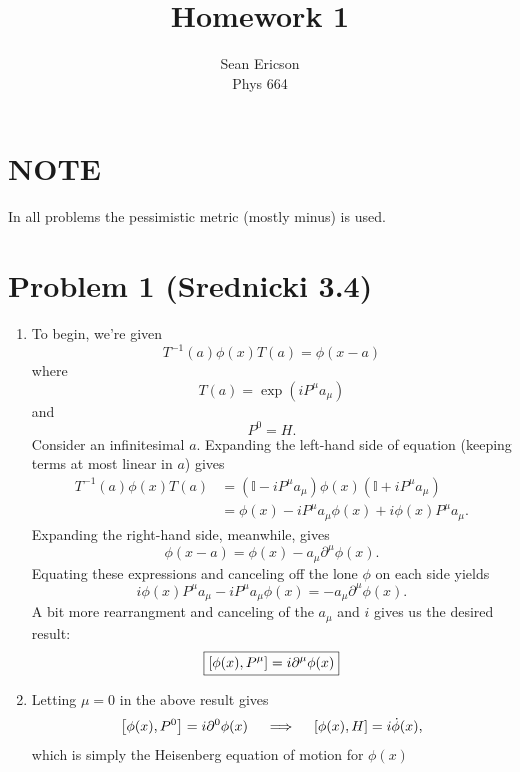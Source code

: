 \documentclass[12pt]{article}
\begin{document}
\title{Homework 1}
\author{Sean Ericson \\ Phys 664}
\maketitle

\section*{NOTE}
In all problems the pessimistic metric (mostly minus) is used.

\section*{Problem 1 \small{(Srednicki 3.4)}}
\begin{enumerate}[label=(\alph*)]
    \item To begin, we're given
    \begin{equation} \label{1} T^{-1}(a)\phi(x)T(a) = \phi(x-a) \end{equation}
    where
    \[ T(a) = \exp(iP^\mu a_\mu) \]
    and
    \[ P^0 = H. \]
    Consider an infinitesimal $a$. Expanding the left-hand side of equation  (keeping terms at most linear in $a$) gives
    \begin{align*}
        T^{-1}(a)\phi(x)T(a) &= \left(\mathbb{I} - iP^\mu a_\mu\right)\phi(x)\left(\mathbb{I} + iP^\mu a_\mu\right) \\
        &= \phi(x) - iP^\mu a_\mu\phi(x) + i\phi(x)P^\mu a_\mu.
    \end{align*}
    Expanding the right-hand side, meanwhile, gives
    \[ \phi(x-a) = \phi(x) - a_\mu\partial^\mu\phi(x). \]
    Equating these expressions and canceling off the lone $\phi$ on each side yields
    \[ i\phi(x)P^\mu a_\mu - iP^\mu a_\mu\phi(x) = - a_\mu\partial^\mu\phi(x). \]
    A bit more rearrangment and canceling of the $a_\mu$ and $i$ gives us the desired result:
    \[ \boxed{\comm{\phi(x)}{P^\mu} = i\partial^\mu\phi(x)} \]

    \item Letting $\mu = 0$ in the above result gives
    \[ \comm{\phi(x)}{P^0} = i\partial^0\phi(x) \quad \implies \quad \comm{\phi(x)}{H} = i\dot{\phi}(x), \]
    which is simply the Heisenberg equation of motion for $\phi(x)$
    

\end{enumerate}
\end{document}
